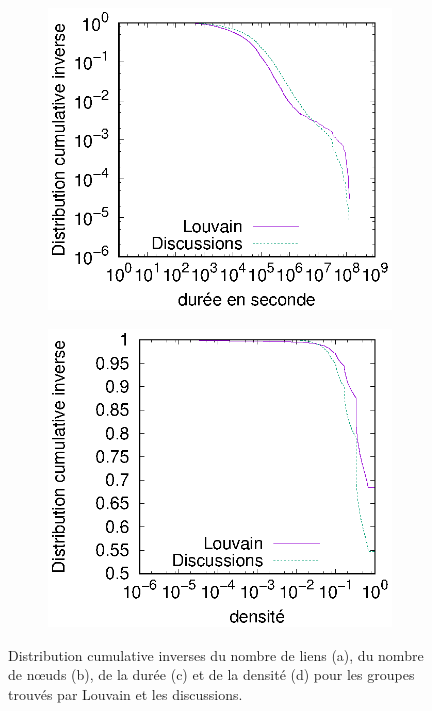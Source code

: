 \begin{figure}[h]
	\begin{subfigure}{0.4\textwidth}
		\includegraphics[width=\linewidth]{img/mailing/Detection/duree}\hfill
		\caption{}		
	\end{subfigure}
	\begin{subfigure}{0.4\textwidth}
		\includegraphics[width=\linewidth]{img/mailing/Detection/densite}
		\caption{\label{fig:dens_mail_louvain}}		
	\end{subfigure}
\caption{Distribution cumulative inverses du nombre de liens (a), du nombre de n\oe{}uds (b), de la durée (c) et de la densité (d) pour les groupes trouvés par Louvain et les discussions.}
\label{fig:carac_mail_louvain}
\end{figure}



